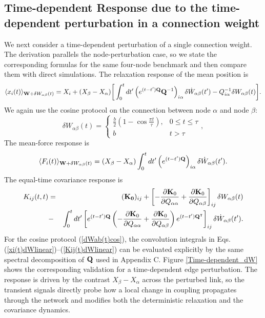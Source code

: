 \subsection{Time-dependent Response due to the time-dependent perturbation in a connection weight}
\quad We next consider a time-dependent perturbation of a single connection weight. The derivation parallels the node-perturbation case, so we state the corresponding formulas for the same four-node benchmark and then compare them with direct simulations. The relaxation response of the mean position is
\begin{equation}
    \langle x_i(t)\rangle_{{\bf W}+\delta W_{\alpha\beta}(t)}
    =X_i+ (X_\beta-X_\alpha)\bigg[\int_0^t dt'\left(e^{(t-t'){\bf Q}}{\bf Q}^{-1} \right)_{i\alpha}\delta{\dot W}_{\alpha\beta}(t') -Q^{-1}_{i\alpha} \delta W_{\alpha\beta}(t)\bigg].
    \label{xi(t)dWlinear}
\end{equation}
We again use the cosine protocol on the connection between node $\alpha$ and node $\beta$:
\begin{equation}
     \delta W_{\alpha\beta}(t)=\begin{cases} \frac{b}{2}(1-\cos\frac{\pi t}{\tau}), & 0\leq t\leq\tau\\
     b &t>\tau
     \end{cases},\label{dWab(t)cos}
\end{equation}
The mean-force response is
\begin{equation}
    \langle F_i(t)\rangle_{{\bf W}+\delta W_{\alpha\beta}(t)}
    =(X_\beta-X_\alpha)\int_0^t dt'
    \left(e^{(t-t'){\bf Q}}\right)_{i\alpha}\delta{\dot W}_{\alpha\beta}(t').
    \label{Fi(t)dWlinear}
\end{equation}
The equal-time covariance response is
\begin{eqnarray}
    K_{ij}(t,t)&=&({\bf K_0})_{ij}
    +\left[- \frac{\partial {\bf K}_0}{\partial Q_{\alpha\alpha}}+\frac{\partial {\bf K}_0}{\partial Q_{\alpha\beta}} \right]_{ij}\delta W_{\alpha\beta}(t)\nonumber\\
    &-&\int_0^t dt' \left[ e^{(t-t'){\bf Q}}\left(-\frac{\partial {\bf K}_0}{\partial Q_{\alpha\alpha}} +\frac{\partial {\bf K}_0}{\partial Q_{\alpha\beta}}\right) e^{(t-t'){\bf Q}^\intercal} \right]_{ij} \delta \dot{W}_{\alpha\beta}(t').
    \label{Kij(t)dWlinear}
\end{eqnarray}
For the cosine protocol (\ref{dWab(t)cos}), the convolution integrals in Eqs. (\ref{xi(t)dWlinear})--(\ref{Kij(t)dWlinear}) can be evaluated explicitly by the same spectral decomposition of ${\bf Q}$ used in Appendix C. Figure \ref{Time-dependent_dW} shows the corresponding validation for a time-dependent edge perturbation. The response is driven by the contrast $X_\beta-X_\alpha$ across the perturbed link, so the transient signals directly probe how a local change in coupling propagates through the network and modifies both the deterministic relaxation and the covariance dynamics.\par
